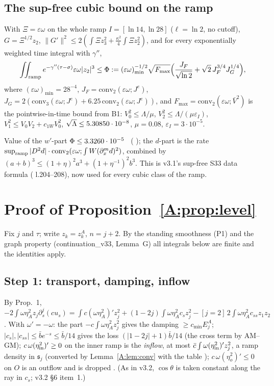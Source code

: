 \documentclass[11pt]{article}
\begin{document}
\subsection{The sup-free cubic bound on the ramp}
\begin{lemma}[$\Phi$; \fn{lemmaU.tex} Lemma~S (sup-free cubic) with $\Xi=\varepsilon\omega$, $L=\kappa$]\label{A:lem:Phi}
With $\Xi=\varepsilon\omega$ on the whole ramp $I=[\ln14,\ln28]$ ($\ell=\ln2$, no cutoff), $G=\Xi^{1/2}z_2$, $\|G'\|^2\le2(\int\Xi z_3^2+\frac{\kappa^2}4\int\Xi z_2^2)$, and for every exponentially weighted time integral with $\gamma''$,
\[
\iint_{\rm ramp}e^{-\gamma''(\tau-\sigma)}\varepsilon\omega|z_2|^3\le\Phi:=(\varepsilon\omega)_{\min}^{-1/2}\sqrt{F_{\max}}\Bigl(\frac{J_F}{\sqrt{\ln2}}+\sqrt2\,J_F^{3/4}J_G^{1/4}\Bigr),
\]
where $(\varepsilon\omega)_{\min}=28^{-4}$, $J_F=\mathrm{conv}_2(\varepsilon\omega;J^e)$, $J_G=2(\mathrm{conv}_3(\varepsilon\omega;J^e)+6.25\,\mathrm{conv}_2(\varepsilon\omega;J^e))$, and $F_{\max}=\mathrm{conv}_2(\varepsilon\omega;\bar V^2)$ is the pointwise-in-time bound from B1: $V_0^2\le\Lambda/\mu$, $V_2^2\le\Lambda/(\mu\varepsilon_I)$, $V_1^2\le V_0V_2+c_{1W}V_0^2$, $\sqrt\Lambda\le5.30850\cdot10^{-8}$, $\mu=0.08$, $\varepsilon_I=3\cdot10^{-5}$.
\end{lemma}
\noindent Value of the $w'$-part $\Phi\le3.3260\cdot10^{-5}$ \tC\ ( ); the $d$-part is the rate $\sup_{\rm ramp}|D^2d|\cdot\mathrm{conv}_2(\varepsilon\omega;\int W(\partial_x^md)^2)$, combined by $(a+b)^3\le(1+\eta)^2a^3+(1+\eta^{-1})^2b^3$. This is v3.1's sup-free S33 data formula ( l.204--208), now used for every cubic class of the ramp.

\section{Proof of Proposition~\ref{A:prop:level}}\label{A:sec:proof}
Fix $j$ and $\tau$; write $z_k=z^A_k$, $n=j+2$. By the standing smoothness (P1) and the graph property (continuation\_v33, Lemma~G) all integrals below are finite and the identities apply.

\subsection{Step 1: transport, damping, inflow}
By  Prop.~1, $-2\int\omega\eta_A^2z_j\partial_s^j(cu_s)=\int c(\omega\eta_A^2)'z_j^2+(1-2j)\int\omega\eta_A^2c_sz_j^2-[j=2]\,2\int\omega\eta_A^2c_{ss}z_1z_2$. With $\omega'=-\omega$: the part $-c\int\omega\eta_A^2z_j^2$ gives the damping $\ge c_{\min}E^A_j$; $|c_s|,|c_{ss}|\le\bar be^{-s}\le\bar b/14$ gives the loss $(|1-2j|+1)\bar b/14$ (the cross term by AM--GM); $c\,\omega(\eta_{\rm in}^2)'\ge0$ on the inner ramp is the \emph{inflow}, at most $\bar c\int\omega(\eta_{\rm in}^2)'z_j^2$, a ramp density in $\mathfrak s_j$ (converted by Lemma~\ref{A:lem:conv} with the table ); $c\,\omega(\eta_o^2)'\le0$ on $O$ is an outflow and is dropped \tP. (As in v3.2, $\cos\theta$ is taken constant along the ray in $c_s$; v3.2 \S6 item~1.)
\end{document}
